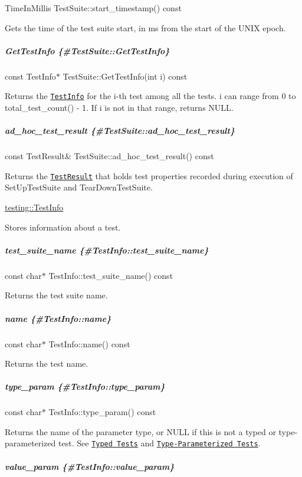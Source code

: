 {\ttfamily Time\+In\+Millis Test\+Suite\+::start\+\_\+timestamp() const}

Gets the time of the test suite start, in ms from the start of the U\+N\+IX epoch.

\subparagraph*{Get\+Test\+Info \{\#\+Test\+Suite\+::\+Get\+Test\+Info\}}

{\ttfamily const Test\+Info$\ast$ Test\+Suite\+::\+Get\+Test\+Info(int i) const}

Returns the \href{#TestInfo}{\tt {\ttfamily Test\+Info}} for the {\ttfamily i}-\/th test among all the tests. {\ttfamily i} can range from 0 to {\ttfamily total\+\_\+test\+\_\+count() -\/ 1}. If {\ttfamily i} is not in that range, returns {\ttfamily N\+U\+LL}.

\subparagraph*{ad\+\_\+hoc\+\_\+test\+\_\+result \{\#\+Test\+Suite\+::ad\+\_\+hoc\+\_\+test\+\_\+result\}}

{\ttfamily const Test\+Result\& Test\+Suite\+::ad\+\_\+hoc\+\_\+test\+\_\+result() const}

Returns the \href{#TestResult}{\tt {\ttfamily Test\+Result}} that holds test properties recorded during execution of {\ttfamily Set\+Up\+Test\+Suite} and {\ttfamily Tear\+Down\+Test\+Suite}.

{\ttfamily \mbox{\hyperlink{classtesting_1_1TestInfo}{testing\+::\+Test\+Info}}}

Stores information about a test.

\subparagraph*{test\+\_\+suite\+\_\+name \{\#\+Test\+Info\+::test\+\_\+suite\+\_\+name\}}

{\ttfamily const char$\ast$ Test\+Info\+::test\+\_\+suite\+\_\+name() const}

Returns the test suite name.

\subparagraph*{name \{\#\+Test\+Info\+::name\}}

{\ttfamily const char$\ast$ Test\+Info\+::name() const}

Returns the test name.

\subparagraph*{type\+\_\+param \{\#\+Test\+Info\+::type\+\_\+param\}}

{\ttfamily const char$\ast$ Test\+Info\+::type\+\_\+param() const}

Returns the name of the parameter type, or {\ttfamily N\+U\+LL} if this is not a typed or type-\/parameterized test. See \href{../advanced.md#typed-tests}{\tt Typed Tests} and \href{../advanced.md#type-parameterized-tests}{\tt Type-\/\+Parameterized Tests}.

\subparagraph*{value\+\_\+param \{\#\+Test\+Info\+::value\+\_\+param\}}


